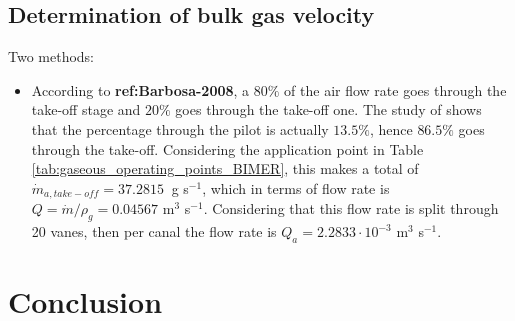 \subsection{Determination of bulk gas velocity}

Two methods:

\begin{itemize}

	\item According to \textbf{ref:Barbosa-2008}, a $80 \%$ of the air flow rate goes through the take-off stage and $20 \%$ goes through the take-off one. The study of  shows that the percentage through the pilot is actually $13.5 \%$, hence $86.5 \%$ goes through the take-off. Considering the application point in Table \ref{tab:gaseous_operating_points_BIMER}, this makes a total of $\dot{m}_{a,take-off} = 37.2815 ~ $ g s$^{-1}$, which in terms of flow rate is $Q = \dot{m} / \rho_g = 0.04567 $ m$^{3}$ s$^{-1}$. Considering that this flow rate is split through 20 vanes, then per canal the flow rate is $Q_a = 2.2833 \cdot 10^{-3}$ m$^{3}$ s$^{-1}$.

\end{itemize}



\section{Conclusion}

%
%
%
%
%
